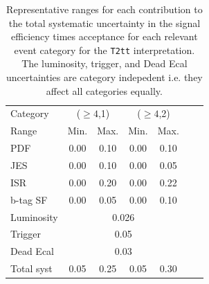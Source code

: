 \begin{table}[h!]
  \caption{Representative ranges for each contribution to the total
    systematic uncertainty in the signal efficiency times acceptance
    for each relevant event category for the \texttt{T2tt}
    interpretation. The luminosity, trigger, and Dead Ecal uncertainties
    are category indepedent i.e. they affect all categories equally. 
    \label{tab:sms-syst-t2cc}
  }   
  \centering
  \begin{tabular}{ lcccccc }
    \hline
    \hline
    Category   & \multicolumn{2}{c}{($\geq 4$,1)} & \multicolumn{2}{c}{($\geq 4$,2)}\\%
    Range      & Min.   & Max.                & Min.   & Max.                     \\%
    \hline                                                                        %
    PDF        & 0.00   & 0.10                & 0.00   & 0.10                     \\%
    JES        & 0.00   & 0.10                & 0.00   & 0.05                     \\%
    ISR        & 0.00   & 0.20                & 0.00   & 0.22                     \\%
    b-tag SF   & 0.00   & 0.05                & 0.00   & 0.10                     \\%
    \hline                                                                        %
    Luminosity & \multicolumn{4}{c}{0.026}                                                                      \\ %
    Trigger & \multicolumn{4}{c}{0.05}                                                                       \\ %
    Dead Ecal & \multicolumn{4}{c}{0.03}                                                                       \\ %
    \hline                                                                                                         %
    Total syst & 0.05   & 0.25                & 0.05   & 0.30                     \\%
    \hline
    \hline
  \end{tabular}
\end{table}

